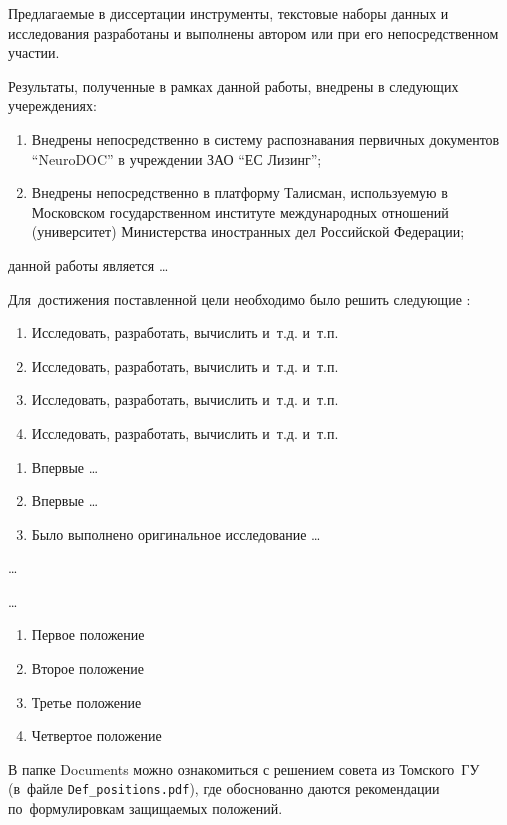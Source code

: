 \underline{\textbf{{\contributionTXT}}} Предлагаемые в диссертации инструменты, текстовые наборы данных и исследования разработаны и выполнены автором или при его непосредственном участии.


\underline{\textbf{{\implementationTXT}}} Результаты, полученные в рамках данной работы, внедрены в следующих учереждениях:
\begin{enumerate}
    \item Внедрены непосредственно в систему распознавания первичных документов “NeuroDOC” в учреждении ЗАО “ЕС Лизинг”;
    \item Внедрены непосредственно в платформу Талисман, используемую в Московском государственном институте международных отношений (университет) Министерства иностранных дел Российской Федерации;
\end{enumerate}




{\aim} данной работы является \ldots


Для~достижения поставленной цели необходимо было решить следующие {\tasks}:
\begin{enumerate}[beginpenalty=10000] %
  \item Исследовать, разработать, вычислить и~т.\:д. и~т.\:п.
  \item Исследовать, разработать, вычислить и~т.\:д. и~т.\:п.
  \item Исследовать, разработать, вычислить и~т.\:д. и~т.\:п.
  \item Исследовать, разработать, вычислить и~т.\:д. и~т.\:п.
\end{enumerate}


{\novelty}
\begin{enumerate}[beginpenalty=10000] %
  \item Впервые \ldots
  \item Впервые \ldots
  \item Было выполнено оригинальное исследование \ldots
\end{enumerate}

{\influence} \ldots

{\methods} \ldots

{}
\begin{enumerate}[beginpenalty=10000] %
  \item Первое положение
  \item Второе положение
  \item Третье положение
  \item Четвертое положение
\end{enumerate}
В папке Documents можно ознакомиться с решением совета из Томского~ГУ
(в~файле \verb+Def_positions.pdf+), где обоснованно даются рекомендации
по~формулировкам защищаемых положений.

